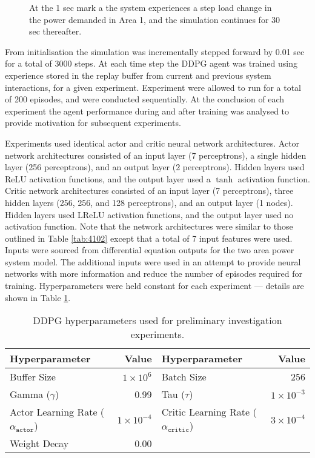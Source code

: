 \begin{figure}[h]
	\centering
	
	\caption{At the 1 sec mark a the system experiences a step load change in the power demanded in Area 1, and the simulation continues for 30 sec thereafter.}
	\label{fig:5001_demand_profile}
\end{figure}

\newpage

From initialisation the simulation was incrementally stepped forward by 0.01 sec for a total of 3000 steps. At each time step the DDPG agent was trained using experience stored in the replay buffer from current and previous system interactions, for a given experiment. Experiment were allowed to run for a total of 200 episodes, and were conducted sequentially. At the conclusion of each experiment the agent performance during and after training was analysed to provide motivation for subsequent experiments.

Experiments used identical actor and critic neural network architectures. Actor network architectures consisted of an input layer (7 perceptrons), a single hidden layer (256 perceptrons), and an output layer (2 perceptrons). Hidden layers used ReLU activation functions, and the output layer used a $\tanh$ activation function. Critic network architectures consisted of an input layer (7 perceptrons), three hidden layers (256, 256, and 128 perceptrons), and an output layer (1 nodes). Hidden layers used LReLU activation functions, and the output layer used no activation function. Note that the network architectures were similar to those outlined in Table \ref{tab:4102} except that a total of 7 input features were used. Inputs were sourced from differential equation outputs for the two area power system model. The additional inputs were used in an attempt to provide neural networks with more information and reduce the number of episodes required for training. Hyperparameters were held constant for each experiment --- details are shown in Table \ref{tab:5000_hyperparameters}.

\begin{table}[h]
	\centering
	\caption{DDPG hyperparameters used for preliminary investigation experiments.}
	\begin{tabular}{lrlr}
	\toprule
	\textbf{Hyperparameter} & \textbf{Value} & \textbf{Hyperparameter} & \textbf{Value} \\
	\midrule
	Buffer Size 	 & $1 \times 10^6$  & Batch Size 	& 256 \\
	Gamma ($\gamma$) & 0.99 	& Tau ($\tau$) 	& $1 \times 10^{-3}$ \\
	Actor Learning Rate ($\alpha_{\texttt{actor}}$) & $1 \times 10^{-4}$ & Critic Learning Rate ($\alpha_{\texttt{critic}}$) & $3 \times 10^{-4} $ \\
	Weight Decay & 0.00 & & \\
	\bottomrule
	\end{tabular}\label{tab:5000_hyperparameters}
\end{table}

